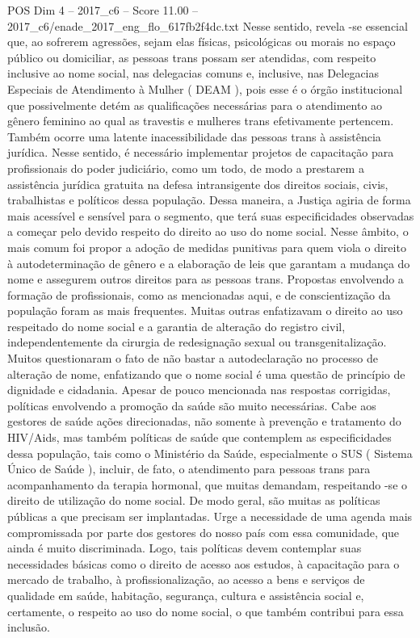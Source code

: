 \begin{textsample}{POS Dim 4 – 2017\_c6 – Score 11.00 – 2017\_c6/enade\_2017\_eng\_flo\_617fb2f4dc.txt}
Nesse sentido, revela -se essencial que, ao sofrerem agressões, sejam elas físicas, psicológicas ou morais no espaço público ou domiciliar, as pessoas trans possam ser atendidas, com respeito inclusive ao nome social, nas delegacias comuns e, inclusive, nas Delegacias Especiais de Atendimento à Mulher ( DEAM ), pois esse é o órgão institucional que possivelmente detém as qualificações necessárias para o atendimento ao gênero feminino ao qual as travestis e mulheres trans efetivamente pertencem.
Também ocorre uma latente inacessibilidade das pessoas trans à assistência jurídica.
Nesse sentido, é necessário implementar projetos de capacitação para profissionais do poder judiciário, como um todo, de modo a prestarem a assistência jurídica gratuita na defesa intransigente dos direitos sociais, civis, trabalhistas e políticos dessa população.
Dessa maneira, a Justiça agiria de forma mais acessível e sensível para o segmento, que terá suas especificidades observadas a começar pelo devido respeito do direito ao uso do nome social.
Nesse âmbito, o mais comum foi propor a adoção de medidas punitivas para quem viola o direito à autodeterminação de gênero e a elaboração de leis que garantam a mudança do nome e assegurem outros direitos para as pessoas trans.
Propostas envolvendo a formação de profissionais, como as mencionadas aqui, e de conscientização da população foram as mais frequentes.
Muitas outras enfatizavam o direito ao uso respeitado do nome social e a garantia de alteração do registro civil, independentemente da cirurgia de redesignação sexual ou transgenitalização.
Muitos questionaram o fato de não bastar a autodeclaração no processo de alteração de nome, enfatizando que o nome social é uma questão de princípio de dignidade e cidadania.
Apesar de pouco mencionada nas respostas corrigidas, políticas envolvendo a promoção da saúde são muito necessárias.
Cabe aos gestores de saúde ações direcionadas, não somente à prevenção e tratamento do HIV/Aids, mas também políticas de saúde que contemplem as especificidades dessa população, tais como o Ministério da Saúde, especialmente o SUS ( Sistema Único de Saúde ), incluir, de fato, o atendimento para pessoas trans para acompanhamento da terapia hormonal, que muitas demandam, respeitando -se o direito de utilização do nome social.
De modo geral, são muitas as políticas públicas a que precisam ser implantadas.
Urge a necessidade de uma agenda mais compromissada por parte dos gestores do nosso país com essa comunidade, que ainda é muito discriminada.
Logo, tais políticas devem contemplar suas necessidades básicas como o direito de acesso aos estudos, à capacitação para o mercado de trabalho, à profissionalização, ao acesso a bens e serviços de qualidade em saúde, habitação, segurança, cultura e assistência social e, certamente, o respeito ao uso do nome social, o que também contribui para essa inclusão.

\end{textsample}
